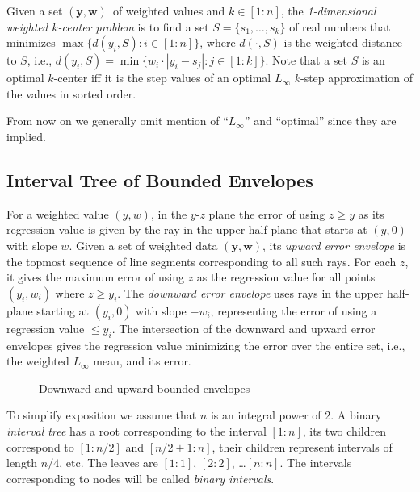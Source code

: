 \documentclass[11pt]{article}
\renewcommand{\vec}[1]{\ensuremath{\mathbf{#1}}}
\newcommand{\data}{\ensuremath{(\vec{y},\vec{w})}}
\newcommand{\inter}[2]{\ensuremath{[#1\!:\!#2]}}
\begin{document}
\vspace*{-0.05in}
Given a set \data\ of weighted values and $k \in \inter{1}{n}$, the \textit{1-dimensional weighted $k$-center problem} is to find a set $S = \{s_1, \ldots, s_k\}$ of real numbers that minimizes $\max\{d(y_i,S): i\in \inter{1}{n}\}$,
where $d(\cdot,S)$ is the weighted distance to $S$, i.e., $d(y_i,S) = \min\{w_i\cdot|y_i - s_j|: j\in \inter{1}{k}\}$.
Note that a set $S$ is an optimal $k$-center iff it is the step values of an optimal $L_\infty$ $k$-step approximation of the values in sorted order.


From now on we generally omit mention of ``$L_\infty$'' and ``optimal'' since they are implied.



\subsection{Interval Tree of Bounded Envelopes} \label{sec:LinftyEnvelopes}


For a weighted value $(y,w)$, in the $y$-$z$ plane the error of using $z \geq y$ as its regression value is given by the ray in the upper half-plane that starts at $(y,0)$ with slope $w$.
Given a set of weighted data \data, its \textit{upward error envelope} is the topmost sequence of line segments corresponding to all such rays.
For each $z$, it gives the maximum error of using $z$ as the regression value for all points $(y_i,w_i)$ where $z \geq y_i$.
The \textit{downward error envelope} uses rays in the upper half-plane starting at $(y_i,0)$ with slope $-w_i$, representing the error of using a regression value $\leq y_i$.
The intersection of the downward and upward error envelopes gives the regression value minimizing the error over the entire set, i.e., the weighted $L_\infty$ mean, and its error.


\begin{figure}

\begin{center}
\end{center}
\vspace{0.08in}

\hrulefill
\vspace*{-0.55in}
\caption{Downward and upward bounded envelopes}  \label{fig:envelopes}
\vspace*{-0.0in}
\end{figure}


To simplify exposition we assume that $n$ is an integral power of 2.
A binary \textit{interval tree} has a root corresponding to the interval \inter{1}{n},
its two children correspond to \inter{1}{n/2} and \inter{n/2+\!1}{n}, 
their children represent intervals of length $n/4$, etc. 
The leaves are \inter{1}{1}, \inter{2}{2}, \ldots \inter{n}{n}.
The intervals corresponding to nodes will be called \textit{binary intervals}.
\end{document}
